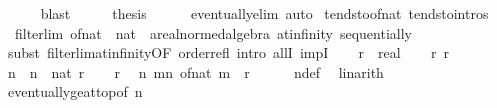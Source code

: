 \begin{isabellebody}
\ \ \ \ \isamarkupfalse%
\ blast\isanewline
\ \ \isamarkupfalse%
\ \isamarkupfalse%
\ {\isacharquery}{\kern0pt}thesis\isanewline
\ \ \ \ \isamarkupfalse%
\ eventually{\isacharunderscore}{\kern0pt}elim\ auto\isanewline
{}\isamarkupfalse%
%
\endisatagproof
{\isafoldproof}%
%
\isadelimproof
\isanewline
%
\endisadelimproof
\isanewline
{}\isamarkupfalse%
\ tendsto{\isacharunderscore}{\kern0pt}of{\isacharunderscore}{\kern0pt}nat\ {\isacharbrackleft}{\kern0pt}tendsto{\isacharunderscore}{\kern0pt}intros{\isacharbrackright}{\kern0pt}{\isacharcolon}{\kern0pt}\isanewline
\ \ {\isachardoublequoteopen}filterlim\ {\isacharparenleft}{\kern0pt}of{\isacharunderscore}{\kern0pt}nat\ {\isacharcolon}{\kern0pt}{\isacharcolon}{\kern0pt}\ nat\ {\isasymRightarrow}\ {\isacharprime}{\kern0pt}a{\isacharcolon}{\kern0pt}{\isacharcolon}{\kern0pt}real{\isacharunderscore}{\kern0pt}normed{\isacharunderscore}{\kern0pt}algebra{\isacharunderscore}{\kern0pt}{}{\isacharparenright}{\kern0pt}\ at{\isacharunderscore}{\kern0pt}infinity\ sequentially{\isachardoublequoteclose}\isanewline
%
\isadelimproof
%
\endisadelimproof
%
\isatagproof
{}\isamarkupfalse%
\ {\isacharparenleft}{\kern0pt}subst\ filterlim{\isacharunderscore}{\kern0pt}at{\isacharunderscore}{\kern0pt}infinity{\isacharbrackleft}{\kern0pt}OF\ order{\isachardot}{\kern0pt}refl{\isacharbrackright}{\kern0pt}{\isacharcomma}{\kern0pt}\ intro\ allI\ impI{\isacharparenright}{\kern0pt}\isanewline
\ \ \isamarkupfalse%
\ r\ {\isacharcolon}{\kern0pt}{\isacharcolon}{\kern0pt}\ real\isanewline
\ \ \isamarkupfalse%
\ r{\isacharcolon}{\kern0pt}\ {\isachardoublequoteopen}r\ {\isachargreater}{\kern0pt}\ {}{\isachardoublequoteclose}\isanewline
\ \ \isamarkupfalse%
\ n\ \ {\isachardoublequoteopen}n\ {\isacharequal}{\kern0pt}\ nat\ {\isasymlceil}r{\isasymrceil}{\isachardoublequoteclose}\isanewline
\ \ \isamarkupfalse%
\ r\ \isamarkupfalse%
\ n{\isacharcolon}{\kern0pt}\ {\isachardoublequoteopen}{\isasymforall}m{\isasymge}n{\isachardot}{\kern0pt}\ of{\isacharunderscore}{\kern0pt}nat\ m\ {\isasymge}\ r{\isachardoublequoteclose}\isanewline
\ \ \ \ \isamarkupfalse%
\ n{\isacharunderscore}{\kern0pt}def\ \isamarkupfalse%
\ linarith\isanewline
\ \ \isamarkupfalse%
\ eventually{\isacharunderscore}{\kern0pt}ge{\isacharunderscore}{\kern0pt}at{\isacharunderscore}{\kern0pt}top{\isacharbrackleft}{\kern0pt}of\ n{\isacharbrackright}{\kern0pt}\ \isamarkupfalse%

\end{isabellebody}
